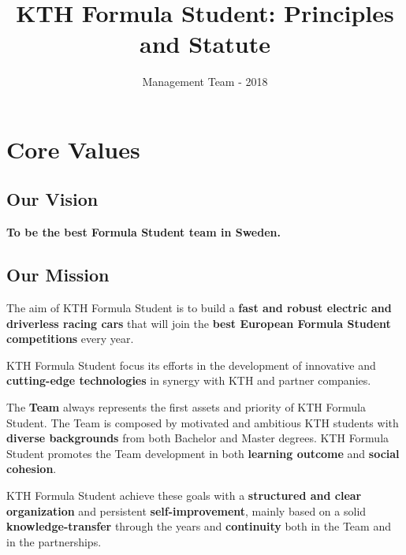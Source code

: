 \documentclass[graybox]{svmult}
\begin{document}
\title*{KTH Formula Student: Principles and Statute}
\author{Management Team - 2018}
\maketitle
\section{Core Values}
\label{sec:1}

\subsection*{Our Vision}

\begin{center}
\Large{{\textbf{To be the best Formula Student team in Sweden.}}}
\end{center}
 
\subsection*{Our Mission}
\large{{The aim of KTH Formula Student is to build a \textbf{fast and robust electric and driverless racing cars} that will join the \textbf{best European Formula Student competitions} every year.

KTH Formula Student focus its efforts in the development of innovative and \textbf{cutting-edge technologies} in synergy with KTH and partner companies.

The \textbf{Team} always represents the first assets and priority of KTH Formula Student. The Team is composed by motivated and ambitious KTH students with \textbf{diverse backgrounds} from both Bachelor and Master degrees. KTH Formula Student promotes the Team development in both \textbf{learning outcome} and \textbf{social cohesion}.

KTH Formula Student achieve these goals with a \textbf{structured and clear organization} and persistent \textbf{self-improvement}, mainly based on a solid \textbf{knowledge-transfer} through the years and \textbf{continuity} both in the Team and in the partnerships.
}}
\end{document}
